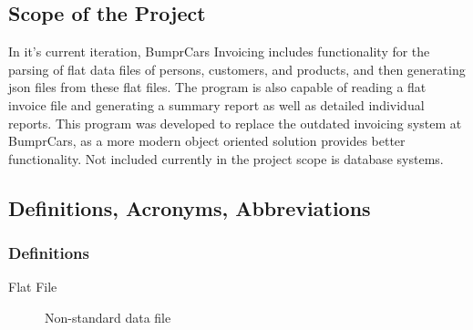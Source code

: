 \documentclass[12pt]{scrartcl} %
\begin{document}
\subsection{Scope of the Project}

In it's current iteration, BumprCars Invoicing includes functionality for the parsing of flat data files of persons, customers, and products, and then generating json files from these flat files. The program is also capable of reading a flat invoice file and generating a summary report as well as detailed individual reports. This program was developed to replace the outdated invoicing system at BumprCars, as a more modern object oriented solution provides better functionality. Not included currently in the project scope is database systems. 


\subsection{Definitions, Acronyms, Abbreviations}

\subsubsection{Definitions}

\begin{description}
  \item[Flat File] Non-standard data file
\end{description} 



  
\end{document}
